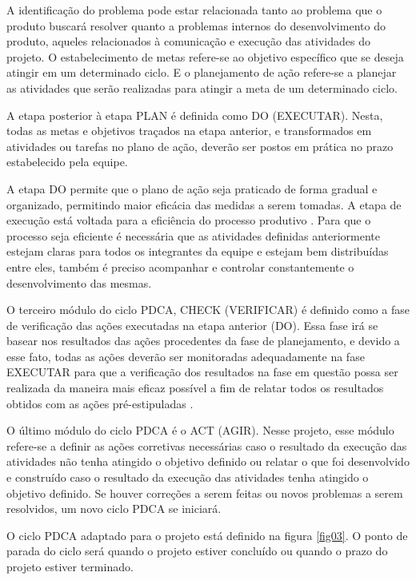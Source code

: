 A identificação do problema pode estar relacionada tanto ao problema que o produto buscará resolver quanto a problemas internos do desenvolvimento do produto, aqueles relacionados à comunicação e execução das atividades do projeto. O estabelecimento de metas refere-se ao objetivo específico que se deseja atingir em um determinado ciclo. E o planejamento de ação refere-se a planejar as atividades que serão realizadas para atingir a meta de um determinado ciclo.

A etapa posterior à etapa PLAN é definida como DO (EXECUTAR). Nesta, todas as metas e objetivos traçados na etapa anterior, e transformados em atividades ou tarefas no plano de ação, deverão ser postos em prática no prazo estabelecido pela equipe.

A etapa DO permite que o plano de ação seja praticado de forma gradual e organizado, permitindo maior eficácia das medidas a serem tomadas. A etapa de execução está voltada para a eficiência do processo produtivo \cite{pdca1}. Para que o processo seja eficiente é necessária que as atividades definidas anteriormente estejam claras para todos os integrantes da equipe e estejam bem distribuídas entre eles, também é preciso acompanhar e controlar constantemente o desenvolvimento das mesmas. 

O terceiro módulo do ciclo PDCA, CHECK (VERIFICAR) é definido como a fase de verificação das ações executadas na etapa anterior (DO). Essa fase irá se basear nos resultados das ações procedentes da fase de planejamento, e devido a esse fato, todas as ações deverão ser monitoradas adequadamente na fase EXECUTAR para que a verificação dos resultados na fase em questão possa ser realizada da maneira mais eficaz possível a fim de relatar todos os resultados obtidos com as ações pré-estipuladas \cite{pdca1}.

O último módulo do ciclo PDCA é o ACT (AGIR). Nesse projeto, esse módulo refere-se a definir as ações corretivas necessárias caso o resultado da execução das atividades não tenha atingido o objetivo definido ou relatar o que foi desenvolvido e construído caso o resultado da execução das atividades tenha atingido o objetivo definido. Se houver correções a serem feitas ou novos problemas a serem resolvidos, um novo ciclo PDCA se iniciará. 

O ciclo PDCA adaptado para o projeto está definido na figura \ref{fig03}. O ponto de parada do ciclo será quando o projeto estiver concluído ou quando o prazo do projeto estiver terminado.

